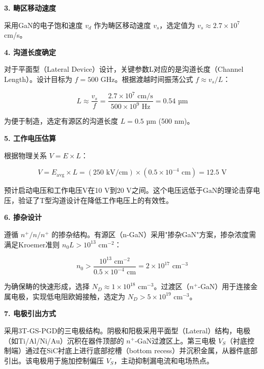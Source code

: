 \documentclass[12pt,a4paper]{article}
\begin{document}
\textbf{3. 畴区移动速度}

采用GaN的电子饱和速度 $v_d$ 作为畴区移动速度 $v_s$，选定值为 $v_s \approx 2.7 \times 10^7$ cm/s。

\textbf{4. 沟道长度确定}

对于平面型（Lateral Device）设计，关键参数L对应的是沟道长度（Channel Length）。设计目标为 $f = 500$ GHz。根据渡越时间振荡公式 $f \approx v_s / L$：

\begin{equation}
L \approx \frac{v_s}{f} = \frac{2.7 \times 10^7 \text{ cm/s}}{500 \times 10^9 \text{ Hz}} = 0.54 \text{ µm}
\end{equation}

为便于制造，选定有源区的沟道长度 $L = 0.5$ µm (500 nm)。

\textbf{5. 工作电压估算}

根据物理关系 $V = E \times L$：

\begin{equation}
V = E_{\text{avg}} \times L = (250 \text{ kV/cm}) \times (0.5 \times 10^{-4} \text{ cm}) = 12.5 \text{ V}
\end{equation}

预计启动电压和工作电压V在10 V到20 V之间。这个电压远低于GaN的理论击穿电压，验证了T型沟道设计在降低工作电压上的有效性。

\textbf{6. 掺杂设计}

遵循 $n^+/n/n^+$ 的掺杂结构。有源区（n-GaN）采用"掺杂GaN"方案，掺杂浓度需满足Kroemer准则 $n_0L > 10^{13}$ cm$^{-2}$：

\begin{equation}
n_0 > \frac{10^{13} \text{ cm}^{-2}}{0.5 \times 10^{-4} \text{ cm}} = 2 \times 10^{17} \text{ cm}^{-3}
\end{equation}

为确保畴的快速形成，选择 $N_D \approx 1 \times 10^{18}$ cm$^{-3}$。过渡区（$n^+$-GaN）用于连接金属电极，实现低电阻欧姆接触，选定为 $N_D > 5 \times 10^{19}$ cm$^{-3}$。

\textbf{7. 电极引出方式}

采用3T-GS-PGD的三电极结构。阴极和阳极采用平面型（Lateral）结构，电极（如Ti/Al/Ni/Au）沉积在器件顶部的 $n^+$-GaN过渡区上。第三电极 $V_S$（衬底控制端）通过在SiC衬底上进行底部挖槽（bottom recess）并沉积金属，从器件底部引出。该电极用于施加控制偏压 $V_S$，主动抑制漏电流和电场热点。
\end{document}
